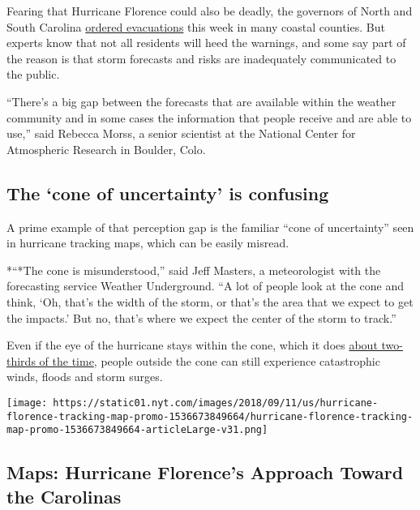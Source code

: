 Fearing that Hurricane Florence could also be deadly, the governors of
North and South Carolina
\href{https://www.nytimes.com/2018/09/10/us/hurricane-florence.html}{ordered
evacuations} this week in many coastal counties. But experts know that
not all residents will heed the warnings, and some say part of the
reason is that storm forecasts and risks are inadequately communicated
to the public.

``There's a big gap between the forecasts that are available within the
weather community and in some cases the information that people receive
and are able to use,'' said Rebecca Morss, a senior scientist at the
National Center for Atmospheric Research in Boulder, Colo.

\hypertarget{the-cone-of-uncertainty-is-confusing}{%
\subsection{The `cone of uncertainty' is
confusing}\label{the-cone-of-uncertainty-is-confusing}}

A prime example of that perception gap is the familiar ``cone of
uncertainty'' seen in hurricane tracking maps, which can be easily
misread.

*``*The cone is misunderstood,'' said Jeff Masters, a meteorologist with
the forecasting service Weather Underground. ``A lot of people look at
the cone and think, `Oh, that's the width of the storm, or that's the
area that we expect to get the impacts.' But no, that's where we expect
the center of the storm to track.''

Even if the eye of the hurricane stays within the cone, which it does
\href{https://www.nhc.noaa.gov/aboutcone.shtml}{about two-thirds of the
time}, people outside the cone can still experience catastrophic winds,
floods and storm surges.

\href{https://www.nytimes.com/interactive/2018/09/10/us/hurricane-florence-tracking-map.html}{}

\texttt{[image: https://static01.nyt.com/images/2018/09/11/us/hurricane-florence-tracking-map-promo-1536673849664/hurricane-florence-tracking-map-promo-1536673849664-articleLarge-v31.png]}

\hypertarget{maps-hurricane-florences-approach-toward-the-carolinas}{%
\subsection{Maps: Hurricane Florence's Approach Toward the
Carolinas}\label{maps-hurricane-florences-approach-toward-the-carolinas}}

